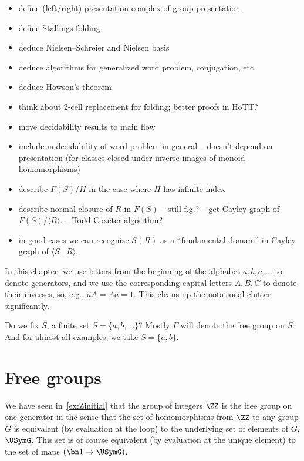 \begin{itemize}
\item define (left/right) presentation complex of group presentation
\item define Stallings folding
\item deduce Nielsen--Schreier and Nielsen basis
\item deduce algorithms for generalized word problem, conjugation, etc.
\item deduce Howson's theorem
\item think about 2-cell replacement for folding; better proofs in HoTT?
\item move decidability results to main flow
\item include undecidability of word problem in general
  -- doesn't depend on presentation (for classes closed under inverse images of monoid homomorphisms)
\item describe $F(S)/H$ in the case where $H$ has infinite index
\item describe normal closure of $R$ in $F(S)$ -- still f.g.? -- get Cayley graph of $F(S)/\langle R\rangle$. -- Todd-Coxeter algorithm?
\item in good cases we can recognize $\mathcal{S}(R)$ as a ``fundamental domain'' in Cayley graph of $\langle S\mid R\rangle$.
\end{itemize}

\begin{remark}
  In this chapter, we use letters from the
  beginning of the alphabet $a,b,c,\dots$
  to denote generators,
  and we use the corresponding capital letters
  $A,B,C$ to denote their inverses,
  so, e.g., $aA=Aa=1$.
  This cleans up the notational clutter significantly.
\end{remark}

Do we fix $S$, a finite set $S=\{a,b,\ldots\}$?
Mostly $F$ will denote the free group on $S$.
And for almost all examples, we take $S = \{a,b\}$.

\section{Free groups}
\label{sec:freegroups}

We have seen in~\cref{ex:Zinitial} that the group of integers $\ZZ$
is the free group on one generator in the sense that the set of homomorphisms
from $\ZZ$ to any group $G$ is equivalent (by evaluation at the loop)
to the underlying set of elements of $G$, $\USymG$.
This set is of course equivalent (by evaluation at the unique element)
to the set of maps $(\bn 1 \to \USymG)$.

